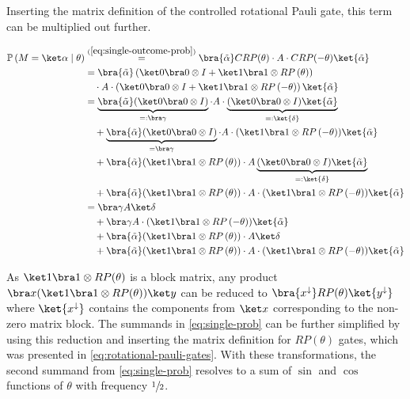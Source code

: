 Inserting the matrix definition of the controlled rotational Pauli gate, this
term can be multiplied out further.

\begin{equation}
    \label{eq:single-prob} 
    \begin{split}
        \mathbb P\left(M = \ket\alpha \mid \theta\right)
            &\stackrel{(\ref{eq:single-outcome-prob})}=\bra{\tilde\alpha} CRP(\theta) \cdot A \cdot CRP(-\theta) \ket{\tilde\alpha} \\
            &=\bra{\tilde\alpha}
                \left(\ket 0 \bra 0 \otimes I + \ket 1 \bra 1 \otimes RP\left(\theta\right)\right) \\
                &\quad \cdot A
                \cdot \left(\ket 0 \bra 0 \otimes I + \ket 1 \bra 1 \otimes RP\left(-\theta\right)\right)
                \ket{\tilde\alpha} \\
            &= \underbrace{\bra{\tilde\alpha} (\ket 0 \bra 0 \otimes I)}_{=: \bra\gamma} \cdot A \cdot \underbrace{(\ket 0 \bra 0 \otimes I) \ket{\tilde\alpha}}_{=: \ket{\delta}} \\
                &\quad + \underbrace{\bra{\tilde\alpha} (\ket 0 \bra 0 \otimes I)}_{= \bra\gamma} \cdot A \cdot (\ket 1 \bra 1 \otimes RP\left(-\theta\right)) \ket{\tilde\alpha} \\
                &\quad + \bra{\tilde\alpha} (\ket 1 \bra 1 \otimes RP\left(\theta\right)) \cdot A \underbrace{(\ket 0 \bra 0 \otimes I) \ket{\tilde\alpha}}_{=: \ket{\delta}} \\
                &\quad + \bra{\tilde\alpha} (\ket 1 \bra 1 \otimes RP\left(\theta\right)) \cdot A \cdot (\ket 1 \bra 1 \otimes RP\left(-\theta\right)) \ket{\tilde\alpha} \\
            &= \bra\gamma A \ket\delta \\
                &\quad + \bra\gamma A \cdot (\ket 1 \bra 1 \otimes RP\left(-\theta\right)) \ket{\tilde\alpha} \\
                &\quad + \bra{\tilde\alpha} (\ket 1 \bra 1 \otimes RP\left(\theta\right)) \cdot A \ket\delta \\
                &\quad + \bra{\tilde\alpha} (\ket 1 \bra 1 \otimes RP\left(\theta\right)) \cdot A \cdot (\ket 1 \bra 1 \otimes RP\left(-\theta\right)) \ket{\tilde\alpha} \\
    \end{split}
\end{equation}

As $\ket1\bra1 \otimes RP(\theta)$ is a block matrix, any product
$\bra x (\ket1\bra1 \otimes RP(\theta)) \ket y$ can be reduced to
$\bra{x^\downarrow} RP(\theta) \ket{y^\downarrow}$ where $\ket{x^\downarrow}$
contains the components from $\ket x$ corresponding to the non-zero matrix
block.
The summands in \autoref{eq:single-prob} can be further simplified by using this
reduction and inserting the matrix definition for $RP(\theta)$ gates, which was
presented in \autoref{eq:rotational-pauli-gates}.
With these transformations, the second summand from \autoref{eq:single-prob}
resolves to a sum of $\sin$ and $\cos$ functions of $\theta$ with frequency
$\sfrac12$.


